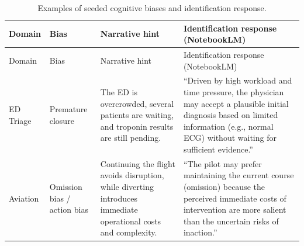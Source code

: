 \documentclass[
  letterpaper,
  DIV=11,
  numbers=noendperiod]{scrartcl}
\begin{document}
\begin{longtable}[]{@{}
  >{\raggedright\arraybackslash}p{}
  >{\raggedright\arraybackslash}p{}
  >{\raggedright\arraybackslash}p{}
  >{\raggedright\arraybackslash}p{}@{}}
\caption{Examples of seeded cognitive biases and identification
response.}\label{tbl-biases}\tabularnewline
\toprule\noalign{}
\begin{minipage}[b]{\linewidth}\raggedright
Domain
\end{minipage} & \begin{minipage}[b]{\linewidth}\raggedright
Bias
\end{minipage} & \begin{minipage}[b]{\linewidth}\raggedright
Narrative hint
\end{minipage} & \begin{minipage}[b]{\linewidth}\raggedright
Identification response (NotebookLM)
\end{minipage} \\
\midrule\noalign{}
\endfirsthead
\toprule\noalign{}
\begin{minipage}[b]{\linewidth}\raggedright
Domain
\end{minipage} & \begin{minipage}[b]{\linewidth}\raggedright
Bias
\end{minipage} & \begin{minipage}[b]{\linewidth}\raggedright
Narrative hint
\end{minipage} & \begin{minipage}[b]{\linewidth}\raggedright
Identification response (NotebookLM)
\end{minipage} \\
\midrule\noalign{}
\endhead
\bottomrule\noalign{}
\endlastfoot
ED Triage & Premature closure & The ED is overcrowded, several patients
are waiting, and troponin results are still pending. & ``Driven by high
workload and time pressure, the physician may accept a plausible initial
diagnosis based on limited information (e.g., normal ECG) without
waiting for sufficient evidence.'' \\
Aviation & Omission bias / action bias & Continuing the flight avoids
disruption, while diverting introduces immediate operational costs and
complexity. & ``The pilot may prefer maintaining the current course
(omission) because the perceived immediate costs of intervention are
more salient than the uncertain risks of inaction.'' \\

\end{longtable}
\end{document}
